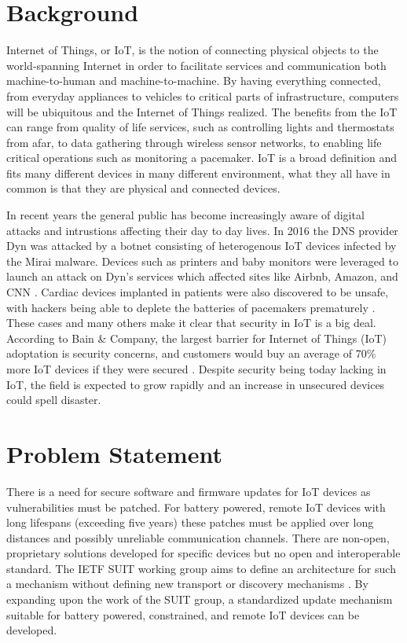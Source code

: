 \documentclass[0-thesis.tex]{subfiles}
\begin{document}
\section{Background}
Internet of Things, or IoT, is the notion of connecting physical objects to the world-spanning 
Internet in order to facilitate services and communication both machine-to-human and 
machine-to-machine. By having everything connected, from everyday appliances to vehicles to 
critical parts of infrastructure, computers will be ubiquitous and the Internet of Things 
realized. The benefits from the IoT can range from quality of life services, such as controlling 
lights and thermostats from afar, to data gathering through wireless sensor networks, to 
enabling life critical operations such as monitoring a pacemaker. IoT is a broad definition 
and fits many different devices in many different environment, what they all have in common 
is that they are physical and connected devices.

In recent years the general public has become increasingly aware of digital attacks and 
intrustions affecting their day to day lives. In 2016 the DNS provider Dyn was attacked 
by a botnet consisting of heterogenous IoT devices infected by the Mirai malware. Devices 
such as printers and baby monitors were leveraged to launch an attack on Dyn's services which 
affected sites like Airbnb, Amazon, and CNN \parencite{perlroth_2016}. Cardiac devices implanted in patients were also
discovered to be unsafe, with hackers being able to deplete the batteries of pacemakers 
prematurely \parencite{hern_2017}. These cases and many others make it clear that security in IoT is a big deal.
According to Bain \& Company, the largest barrier for Internet of Things (IoT) adoptation 
is security concerns, and customers would buy an average of 70\% more IoT devices if they 
were secured \parencite{ali_bosche_ford_2018}. Despite security being today lacking in IoT, the 
field is expected to grow rapidly and an increase in unsecured devices could spell disaster.

\section{Problem Statement}
There is a need for secure software and firmware updates for IoT devices as vulnerabilities 
must be patched. For battery powered, remote IoT devices with long lifespans (exceeding five years) 
these patches must be applied over long distances and possibly unreliable communication channels.
There are non-open, proprietary solutions developed for specific devices but no open and 
interoperable standard. The IETF SUIT working group aims to define an architecture for such a 
mechanism without defining new transport or discovery mechanisms \parencite{suit}. By expanding upon the work of 
the SUIT group, a standardized update mechanism suitable for battery powered, constrained, and remote 
IoT devices can be developed.
\end{document}
